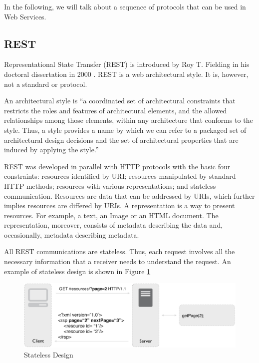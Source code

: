 In the following, we will talk about a sequence of protocols that can be used in Web Services.

\subsection{REST}
Representational State Transfer (REST) is introduced by Roy T. Fielding in his doctoral dissertation in 2000 \cite {fielding2002principled}. REST is a web architectural style. It is, however, not a standard or protocol. 

An architectural style is ``a coordinated set of architectural constraints that restricts the roles and features of architectural elements, and the allowed relationships among those elements, within any architecture that conforms to the style. Thus, a style provides a name by which we can refer to a packaged set of architectural design decisions and the set of architectural properties that are induced by applying the style.'' \cite {fielding2002principled}

REST was developed in parallel with HTTP protocols with the basic four constraints: resources identified by URI; resources manipulated by standard HTTP methods; resources with various representations; and stateless communication. Resources are data that can be addressed by URIs, which further implies resources are differed by URIs. A representation is a way to present resources. For example, a text, an Image or an HTML document. The representation, moreover, consists of metadata describing the data and, occasionally, metadata describing metadata.

All REST communications are stateless. Thus, each request involves all the necessary information that a receiver needs to understand the request. An example of stateless design is shown in Figure \ref{fig:stateless-design} \cite{rodriguez2008restful}

\begin{figure}[ht]
  \begin{center}
    \includegraphics[width=1\textwidth]{images/stateless-design.pdf}
    \caption{Stateless Design}
    \label{fig:stateless-design}
  \end{center}
\end{figure}

